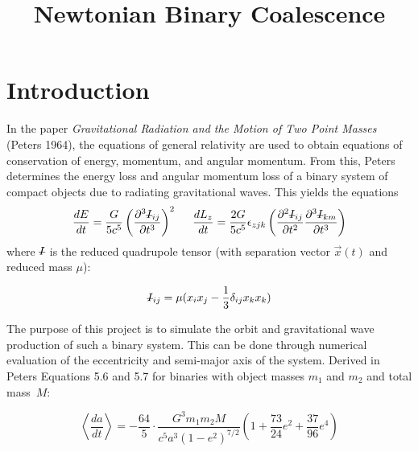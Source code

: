 \documentclass[preprint2]{aastex}
\newcommand{\Ibar}{\mbox{\st{$I$}}}
\begin{document}
\title{Newtonian Binary Coalescence}

\author{
\vspace{0.2cm} \vspace{1cm}}



\section{Introduction}

In the paper \textit{Gravitational Radiation and the Motion of Two Point Masses} (Peters 1964), the equations of general relativity are used to obtain equations of conservation of energy, momentum, and angular momentum. From this, Peters determines the energy loss and angular momentum loss of a binary system of compact objects due to radiating gravitational waves. This yields the equations
\[ \frac{dE}{dt} = \frac{G}{5c^5} \left( \frac{\partial^3 \Ibar_{ij}}{\partial t^3} \right)^2 \hspace*{0.5cm} \frac{dL_z}{dt} = \frac{2G}{5c^5} \epsilon_{zjk} \left( \frac{\partial^2 \Ibar_{ij}}{\partial t^2} \frac{\partial^3 \Ibar_{km}}{\partial t^3} \right) \]
where \(\Ibar\) is the reduced quadrupole tensor (with separation vector \(\vec{x} (t)\) and reduced mass $\mu$):

\begin{equation} \label{quad}
\Ibar_{ij}  =\mu (x_i x_j - \frac{1}{3} \delta_{ij} x_k x_k)
\end{equation}

The purpose of this project is to simulate the orbit and gravitational wave production of such a binary system. This can be done through numerical evaluation of the eccentricity and semi-major axis of the system. Derived in Peters Equations 5.6 and 5.7 for binaries with object masses \(m_1\) and \(m_2\) and total mass~\(M\):

\begin{equation} \label{axis}
\left< \frac{da}{dt} \right> = - \frac{64}{5} \cdot \frac{G^3 m_1 m_2 M}{c^5 a^3 (1 - e^2)^{7/2}} \left( 1 + \frac{73}{24} e^2 + \frac{37}{96} e^4 \right)
\end{equation}
\end{document}
